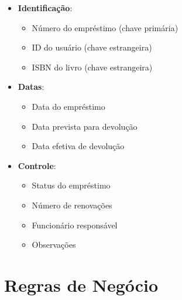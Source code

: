 \documentclass[12pt,a4paper]{article}
\begin{document}
\begin{tcolorbox}[title=Empréstimo]
\begin{itemize}[leftmargin=*]
    \item \textbf{Identificação}:
    \begin{itemize}
        \item Número do empréstimo (chave primária)
        \item ID do usuário (chave estrangeira)
        \item ISBN do livro (chave estrangeira)
    \end{itemize}
    \item \textbf{Datas}:
    \begin{itemize}
        \item Data do empréstimo
        \item Data prevista para devolução
        \item Data efetiva de devolução
    \end{itemize}
    \item \textbf{Controle}:
    \begin{itemize}
        \item Status do empréstimo
        \item Número de renovações
        \item Funcionário responsável
        \item Observações
    \end{itemize}
\end{itemize}
\end{tcolorbox}



\section{Regras de Negócio}
\end{document}
